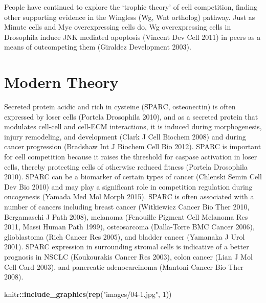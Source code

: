 \documentclass[]{book}
\newenvironment{Shaded}{\begin{snugshade}}{\end{snugshade}}
\newcommand{\KeywordTok}[1]{\textcolor[rgb]{0.13,0.29,0.53}{\textbf{#1}}}
\newcommand{\DecValTok}[1]{\textcolor[rgb]{0.00,0.00,0.81}{#1}}
\newcommand{\StringTok}[1]{\textcolor[rgb]{0.31,0.60,0.02}{#1}}
\newcommand{\OperatorTok}[1]{\textcolor[rgb]{0.81,0.36,0.00}{\textbf{#1}}}
\newcommand{\NormalTok}[1]{#1}
\begin{document}
People have continued to explore the `trophic theory' of cell
competition, finding other supporting evidence in the Wingless (Wg, Wnt
ortholog) pathway. Just as Minute cells and Myc overexpressing cells do,
Wg overexpressing cells in Drosophila induce JNK mediated apoptosis
(Vincent Dev Cell 2011) in peers as a means of outcompeting them
(Giraldez Development 2003).

\section{Modern Theory}\label{modern-theory}

Secreted protein acidic and rich in cysteine (SPARC, osteonectin) is
often expressed by loser cells (Portela Drosophila 2010), and as a
secreted protein that modulates cell-cell and cell-ECM interactions, it
is induced during morphogenesis, injury remodeling, and development
(Clark J Cell Biochem 2008) and during cancer progression (Bradshaw Int
J Biochem Cell Bio 2012). SPARC is important for cell competition
because it raises the threshold for caspase activation in loser cells,
thereby protecting cells of otherwise reduced fitness (Portela
Drosophila 2010). SPARC can be a biomarker of certain types of cancer
(Chlenski Semin Cell Dev Bio 2010) and may play a significant role in
competition regulation during oncogenesis (Yamada Med Mol Morph 2015).
SPARC is often associated with a number of cancers including breast
cancer (Witkiewicz Cancer Bio Ther 2010, Bergamaschi J Path 2008),
melanoma (Fenouille Pigment Cell Melanoma Res 2011, Massi Human Path
1999), osteosarcoma (Dalla-Torre BMC Cancer 2006), glioblastoma (Rich
Cancer Res 2005), and bladder cancer (Yamanaka J Urol 2001). SPARC
expression in surrounding stromal cells is indicative of a better
prognosis in NSCLC (Koukourakis Cancer Res 2003), colon cancer (Lian J
Mol Cell Card 2003), and pancreatic adenocarcinoma (Mantoni Cancer Bio
Ther 2008).

\begin{Shaded}
\begin{Highlighting}[]
\NormalTok{knitr}\OperatorTok{::}\KeywordTok{include_graphics}\NormalTok{(}\KeywordTok{rep}\NormalTok{(}\StringTok{"images/04-1.jpg"}\NormalTok{, }\DecValTok{1}\NormalTok{))}
\end{Highlighting}
\end{Shaded}
\end{document}
